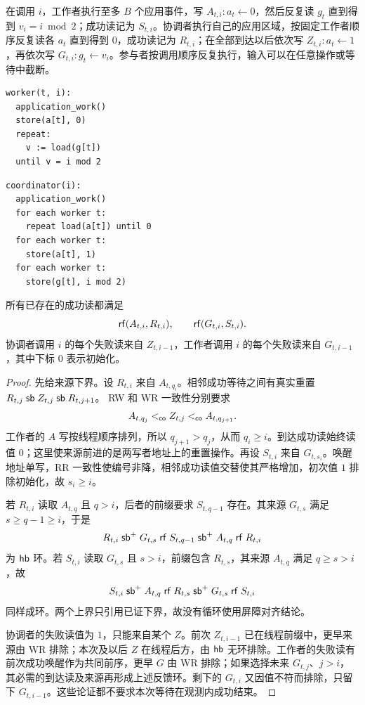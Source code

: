 在调用 $i$，工作者执行至多 $B$ 个应用事件，写 $A_{t,i}:a_t\gets0$，然后反复读 $g_t$ 直到得到 $v_i=i\bmod2$；成功读记为 $S_{t,i}$。协调者执行自己的应用区域，按固定工作者顺序反复读各 $a_t$ 直到得到 $0$，成功读记为 $R_{t,i}$；在全部到达以后依次写 $Z_{t,i}:a_t\gets1$，再依次写 $G_{t,i}:g_t\gets v_i$。参与者按调用顺序反复执行，输入可以在任意操作或等待中截断。
\begin{center}
\begin{minipage}[t]{.48\linewidth}\small
\begin{verbatim}
worker(t, i):
  application_work()
  store(a[t], 0)
  repeat:
    v := load(g[t])
  until v = i mod 2
\end{verbatim}
\end{minipage}\hfill
\begin{minipage}[t]{.48\linewidth}\small
\begin{verbatim}
coordinator(i):
  application_work()
  for each worker t:
    repeat load(a[t]) until 0
  for each worker t:
    store(a[t], 1)
  for each worker t:
    store(g[t], i mod 2)
\end{verbatim}
\end{minipage}
\end{center}

\begin{lemma}[重置驱动的来源前进与反馈对齐]\label{lem:barrier}
所有已存在的成功读都满足
\[
 \mathsf{rf}(A_{t,i},R_{t,i}),\qquad \mathsf{rf}(G_{t,i},S_{t,i}).
\]
协调者调用 $i$ 的每个失败读来自 $Z_{t,i-1}$，工作者调用 $i$ 的每个失败读来自 $G_{t,i-1}$，其中下标 $0$ 表示初始化。
\end{lemma}
\begin{proof}
先给来源下界。设 $R_{t,i}$ 来自 $A_{t,q_i}$。相邻成功等待之间有真实重置
$R_{t,j}\mathrel{\mathsf{sb}}Z_{t,j}\mathrel{\mathsf{sb}}R_{t,j+1}$。
RW 和 WR 一致性分别要求
\[
 A_{t,q_j}<_{\mathsf{co}}Z_{t,j}<_{\mathsf{co}}A_{t,q_{j+1}}.
\]
工作者的 $A$ 写按线程顺序排列，所以 $q_{j+1}>q_j$，从而 $q_i\ge i$。到达成功读始终读值 $0$；这里使来源前进的是两写者地址上的重置操作。再设 $S_{t,i}$ 来自 $G_{t,s_i}$。唤醒地址单写，RR 一致性使编号非降，相邻成功读值交替使其严格增加，初次值 $1$ 排除初始化，故 $s_i\ge i$。

若 $R_{t,i}$ 读取 $A_{t,q}$ 且 $q>i$，后者的前缀要求 $S_{t,q-1}$ 存在。其来源 $G_{t,s}$ 满足 $s\ge q-1\ge i$，于是
\[
 R_{t,i}\mathrel{\mathsf{sb}^+}G_{t,s}\mathrel{\mathsf{rf}}S_{t,q-1}
 \mathrel{\mathsf{sb}^+}A_{t,q}\mathrel{\mathsf{rf}}R_{t,i}
\]
为 $\mathsf{hb}$ 环。若 $S_{t,i}$ 读取 $G_{t,s}$ 且 $s>i$，前缀包含 $R_{t,s}$，其来源 $A_{t,q}$ 满足 $q\ge s>i$，故
\[
 S_{t,i}\mathrel{\mathsf{sb}^+}A_{t,q}\mathrel{\mathsf{rf}}R_{t,s}
 \mathrel{\mathsf{sb}^+}G_{t,s}\mathrel{\mathsf{rf}}S_{t,i}
\]
同样成环。两个上界只引用已证下界，故没有循环使用屏障对齐结论。

协调者的失败读值为 $1$，只能来自某个 $Z$。前次 $Z_{t,i-1}$ 已在线程前缀中，更早来源由 WR 排除；本次及以后 $Z$ 在线程后方，由 $\mathsf{hb}$ 无环排除。工作者的失败读有前次成功唤醒作为共同前序，更早 $G$ 由 WR 排除；如果选择未来 $G_{t,j}$、$j>i$，其必需的到达读及来源再形成上述反馈环。剩下的 $G_{t,i}$ 又因值不符而排除，只留下 $G_{t,i-1}$。这些论证都不要求本次等待在观测内成功结束。\qedhere
\end{proof}

